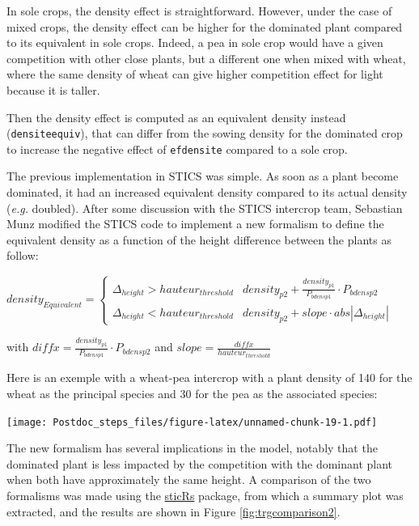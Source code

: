 \documentclass[]{book}
\theoremstyle{definition}
\theoremstyle{definition}
\theoremstyle{definition}
\theoremstyle{remark}
\begin{document}
In sole crops, the density effect is straightforward. However, under the
case of mixed crops, the density effect can be higher for the dominated
plant compared to its equivalent in sole crops. Indeed, a pea in sole
crop would have a given competition with other close plants, but a
different one when mixed with wheat, where the same density of wheat can
give higher competition effect for light because it is taller.

Then the density effect is computed as an equivalent density instead
(\texttt{densiteequiv}), that can differ from the sowing density for the
dominated crop to increase the negative effect of \texttt{efdensite}
compared to a sole crop.

The previous implementation in STICS was simple. As soon as a plant
become dominated, it had an increased equivalent density compared to its
actual density (\emph{e.g.} doubled). After some discussion with the
STICS intercrop team, Sebastian Munz modified the STICS code to
implement a new formalism to define the equivalent density as a function
of the height difference between the plants as follow:

\(density_{Equivalent} =\begin{cases}\Delta_{height} > hauteur_{threshold} & density_{p2} + \frac{density_{p1}}{P_{bdensp1}}\cdot P_{bdensp2} \\ \Delta_{height} < hauteur_{threshold} & density_{p2}+slope\cdot abs\left|\Delta_{height}\right| \end{cases}\)

with \(diffx= \frac{density_{p1}}{P_{bdensp1}}\cdot P_{bdensp2}\) and
\(slope= \frac{diffx}{hauteur_{threshold}}\)

Here is an exemple with a wheat-pea intercrop with a plant density of
140 for the wheat as the principal species and 30 for the pea as the
associated species:

\texttt{[image: Postdoc\_steps\_files/figure-latex/unnamed-chunk-19-1.pdf]}

The new formalism has several implications in the model, notably that
the dominated plant is less impacted by the competition with the
dominant plant when both have approximately the same height. A
comparison of the two formalisms was made using the
\href{https://github.com/VEZY/sticRs}{sticRs} package, from which a
summary plot was extracted, and the results are shown in Figure
\ref{fig:trgcomparison2}.
\end{document}
